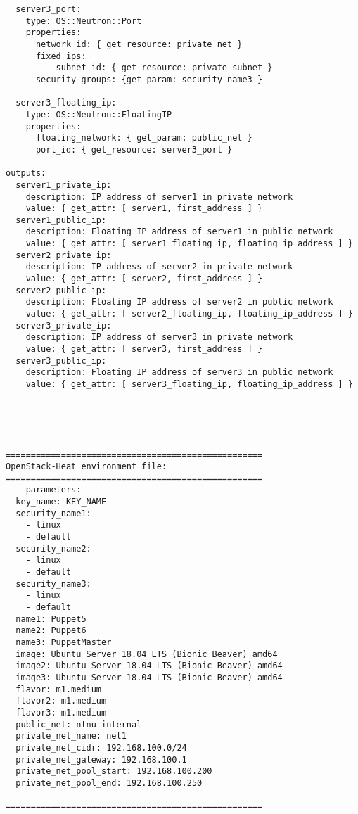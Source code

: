 \begin{verbatim}
  server3_port:
    type: OS::Neutron::Port
    properties:
      network_id: { get_resource: private_net }
      fixed_ips:
        - subnet_id: { get_resource: private_subnet }
      security_groups: {get_param: security_name3 }

  server3_floating_ip:
    type: OS::Neutron::FloatingIP
    properties:
      floating_network: { get_param: public_net }
      port_id: { get_resource: server3_port }

outputs:
  server1_private_ip:
    description: IP address of server1 in private network
    value: { get_attr: [ server1, first_address ] }
  server1_public_ip:
    description: Floating IP address of server1 in public network
    value: { get_attr: [ server1_floating_ip, floating_ip_address ] }
  server2_private_ip:
    description: IP address of server2 in private network
    value: { get_attr: [ server2, first_address ] }
  server2_public_ip:
    description: Floating IP address of server2 in public network
    value: { get_attr: [ server2_floating_ip, floating_ip_address ] }
  server3_private_ip:
    description: IP address of server3 in private network
    value: { get_attr: [ server3, first_address ] }
  server3_public_ip:
    description: Floating IP address of server3 in public network
    value: { get_attr: [ server3_floating_ip, floating_ip_address ] }
\end{verbatim}
\\\\
\begin{verbatim}

===================================================
OpenStack-Heat environment file:
===================================================
    parameters:
  key_name: KEY_NAME
  security_name1:
    - linux
    - default
  security_name2: 
    - linux
    - default
  security_name3:
    - linux
    - default
  name1: Puppet5
  name2: Puppet6
  name3: PuppetMaster
  image: Ubuntu Server 18.04 LTS (Bionic Beaver) amd64
  image2: Ubuntu Server 18.04 LTS (Bionic Beaver) amd64
  image3: Ubuntu Server 18.04 LTS (Bionic Beaver) amd64
  flavor: m1.medium
  flavor2: m1.medium
  flavor3: m1.medium
  public_net: ntnu-internal
  private_net_name: net1
  private_net_cidr: 192.168.100.0/24
  private_net_gateway: 192.168.100.1
  private_net_pool_start: 192.168.100.200
  private_net_pool_end: 192.168.100.250
  
===================================================
\end{verbatim}


